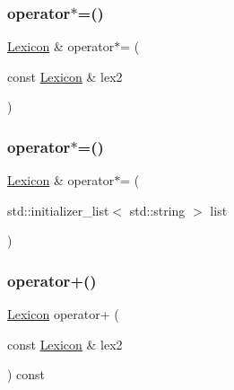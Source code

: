 \subsubsection{\texorpdfstring{operator$\ast$=()}{operator*=()}\hspace{0.1cm}{\footnotesize\ttfamily [1/2]}}
{\footnotesize\ttfamily \mbox{\hyperlink{classLexicon}{Lexicon}} \& operator$\ast$= (\begin{DoxyParamCaption}\item[{const \mbox{\hyperlink{classLexicon}{Lexicon}} \&}]{lex2 }\end{DoxyParamCaption})}

\mbox{\label{classLexicon_a79ada3cb64d9f074114ce895c67be781}} 
\subsubsection{\texorpdfstring{operator$\ast$=()}{operator*=()}\hspace{0.1cm}{\footnotesize\ttfamily [2/2]}}
{\footnotesize\ttfamily \mbox{\hyperlink{classLexicon}{Lexicon}} \& operator$\ast$= (\begin{DoxyParamCaption}\item[{std\+::initializer\+\_\+list$<$ std\+::string $>$}]{list }\end{DoxyParamCaption})}

\mbox{\label{classLexicon_acfc41a903b549304f3b70e48fd2e52e4}} 
\subsubsection{\texorpdfstring{operator+()}{operator+()}\hspace{0.1cm}{\footnotesize\ttfamily [1/3]}}
{\footnotesize\ttfamily \mbox{\hyperlink{classLexicon}{Lexicon}} operator+ (\begin{DoxyParamCaption}\item[{const \mbox{\hyperlink{classLexicon}{Lexicon}} \&}]{lex2 }\end{DoxyParamCaption}) const}

\mbox{\label{classLexicon_a4436a915b6de75438364ed061e0e9491}} 
